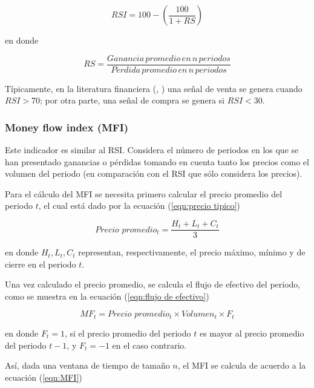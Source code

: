 \documentclass[12pt]{report}
\theoremstyle{break}
\theoremstyle{break}
\begin{document}
\begin{equation} \label{eqn:RSI}
RSI = 100 - \left( \frac{100}{1 + RS} \right)
\end{equation}

en donde 

\begin{equation} \label{eqn:RSI RS}
RS = \frac{Ganancia\,promedio\,en\,n\,periodos}{P\acute{e}rdida\,promedio\,en\,n\,periodos}
\end{equation}

Típicamente, en la literatura financiera (\cite{technicalAnalysisKirkPatrick}, \cite{encycoplediaTechnicalIndicators}) una señal de venta se genera cuando $RSI > 70$; por otra parte, una señal de compra se genera si $RSI < 30$.

\subsubsection{Money flow index (MFI)}
\label{subsubseccion:money flow index}
Este indicador es similar al RSI. Considera el número de periodos en los que se han presentado ganancias o pérdidas tomando en cuenta tanto los precios como el volumen del periodo (en comparación con el RSI que sólo considera los precios).

Para el cálculo del MFI se necesita primero calcular el precio promedio del periodo $t$, el cual está dado por la ecuación (\ref{eqn:precio tipico})

\begin{equation} \label{eqn:precio tipico}
Precio\, \, promedio_t = \dfrac{H_{t} + L_{t} + C_{t}}{3}
\end{equation}

en donde $H_{t}, L_t, C_t$ representan, respectivamente, el precio máximo, mínimo y de cierre en el periodo $t$.

Una vez calculado el precio promedio, se calcula el flujo de efectivo del periodo, como se muestra en la ecuación (\ref{eqn:flujo de efectivo})

\begin{equation} \label{eqn:flujo de efectivo}
MF_t = Precio\, \, promedio_t \times Volumen_t \times F_t
\end{equation}

en donde $F_t = 1$, si el precio promedio del periodo $t$ es mayor al precio promedio del periodo $t-1$, y $F_t = -1$ en el caso contrario.

Así, dada una ventana de tiempo de tamaño $n$, el MFI se calcula de acuerdo a la ecuación (\ref{eqn:MFI})
\end{document}
